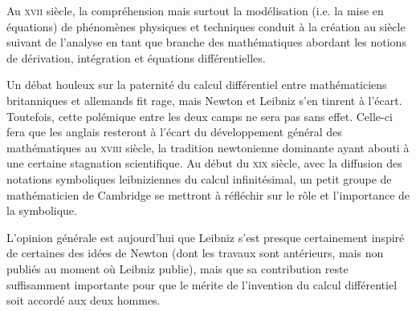 \begin{histoire}%
Au \textsc{xvii} siècle, la compréhension mais surtout la modélisation (i.e. la mise en équations) de phénomènes physiques et techniques conduit à la création au siècle suivant de l'analyse en tant que branche des mathématiques abordant les notions de dérivation, intégration et équations différentielles.

\medskip
{}

Un débat houleux sur la paternité du calcul différentiel entre mathématiciens britanniques et allemands fit rage, mais Newton et Leibniz s'en tinrent à l'écart.
Toutefois, cette polémique entre les deux camps ne sera pas sans effet.
Celle-ci fera que les anglais resteront à l'écart du développement général des mathématiques au \textsc{xviii} siècle, la tradition newtonienne dominante ayant abouti à une certaine stagnation scientifique. Au début du \textsc{xix} siècle, avec la diffusion des notations symboliques leibniziennes du calcul infinitésimal, un petit groupe de mathématicien de Cambridge se mettront à réfléchir sur le rôle et l'importance de la symbolique.

\medskip
L'opinion générale est aujourd'hui que Leibniz s'est presque certainement inspiré de certaines des idées de Newton (dont les travaux sont antérieurs, mais non publiés au moment où Leibniz publie), mais que sa contribution reste suffisamment importante pour que le mérite de l'invention du calcul différentiel soit accordé aux deux hommes.


\end{histoire}

